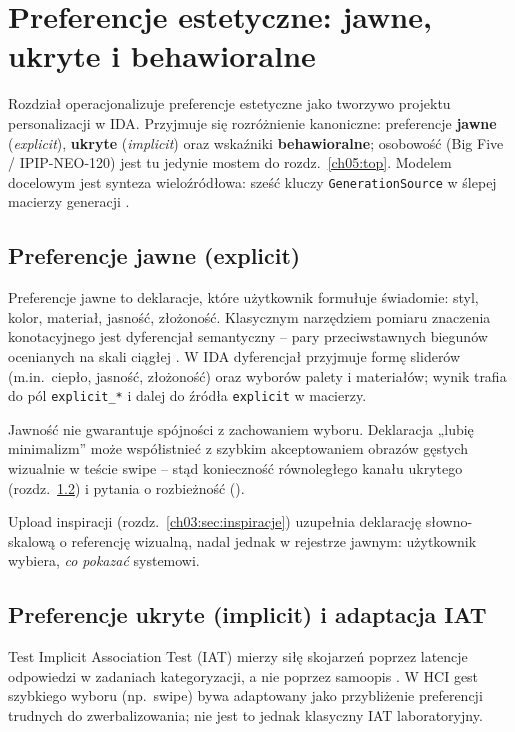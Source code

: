 \chapter{Preferencje estetyczne: jawne, ukryte i behawioralne}
\label{ch03:top}

Rozdział operacjonalizuje preferencje estetyczne jako tworzywo projektu personalizacji w IDA.
Przyjmuje się rozróżnienie kanoniczne: preferencje \textbf{jawne} (\emph{explicit}), \textbf{ukryte} (\emph{implicit}) oraz wskaźniki \textbf{behawioralne}; osobowość (Big Five / IPIP-NEO-120) jest tu jedynie mostem do rozdz.~\ref{ch05:top}.
Modelem docelowym jest synteza wieloźródłowa: sześć kluczy \texttt{GenerationSource} w ślepej macierzy generacji \parencite{idaPlatform2026}.

\section{Preferencje jawne (explicit)}
\label{ch03:sec:explicit}

Preferencje jawne to deklaracje, które użytkownik formułuje świadomie: styl, kolor, materiał, jasność, złożoność.
Klasycznym narzędziem pomiaru znaczenia konotacyjnego jest dyferencjał semantyczny -- pary przeciwstawnych biegunów ocenianych na skali ciągłej \parencite{osgood1957measurement}.
W IDA dyferencjał przyjmuje formę sliderów (m.in.\ ciepło, jasność, złożoność) oraz wyborów palety i materiałów; wynik trafia do pól \texttt{explicit\_*} i dalej do źródła \texttt{explicit} w macierzy.

Jawność nie gwarantuje spójności z zachowaniem wyboru.
Deklaracja „lubię minimalizm” może współistnieć z szybkim akceptowaniem obrazów gęstych wizualnie w teście swipe -- stąd konieczność równoległego kanału ukrytego (rozdz.~\ref{ch03:sec:implicit}) i pytania o rozbieżność ().

Upload inspiracji (rozdz.~\ref{ch03:sec:inspiracje}) uzupełnia deklarację słowno-skalową o referencję wizualną, nadal jednak w rejestrze jawnym: użytkownik wybiera, \emph{co pokazać} systemowi.

\section{Preferencje ukryte (implicit) i adaptacja IAT}
\label{ch03:sec:implicit}

Test Implicit Association Test (IAT) mierzy siłę skojarzeń poprzez latencje odpowiedzi w zadaniach kategoryzacji, a nie poprzez samoopis \parencite{greenwald1998iat}.
W HCI gest szybkiego wyboru (np.\ swipe) bywa adaptowany jako przybliżenie preferencji trudnych do zwerbalizowania; nie jest to jednak klasyczny IAT laboratoryjny.

